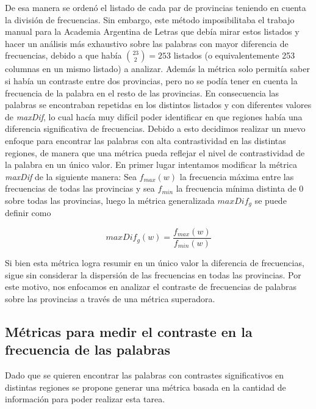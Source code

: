 De esa manera se ordenó el listado de cada par de provincias teniendo en cuenta la división de frecuencias. 
Sin embargo, este método imposibilitaba el trabajo manual para la Academia Argentina de Letras que debía mirar estos listados y hacer un análisis más exhaustivo sobre las palabras con mayor diferencia de frecuencias, debido a que había $\binom{23}{2} = 253$
listados (o equivalentemente 253 columnas en un mismo listado) a analizar. Además la métrica solo permitía saber si había un contraste entre dos provincias, pero no se podía tener en cuenta la frecuencia de la palabra en el resto de las provincias. 
En consecuencia las palabras se encontraban repetidas en los distintos listados y con diferentes valores de \textit{maxDif}, lo cual hacía muy difícil poder identificar en que regiones había una diferencia significativa de frecuencias.
Debido a esto decidimos realizar un nuevo enfoque para encontrar las palabras con alta contrastividad en las distintas regiones, de manera que una métrica pueda reflejar el nivel de contrastividad de la palabra en un único valor. En primer lugar intentamos modificar la métrica \textit{maxDif} de la siguiente manera: 
Sea $f_{max}(w)$ la frecuencia máxima entre las frecuencias de todas las provincias y sea $f_{min}$ la frecuencia mínima distinta de $0$ sobre todas las provincias, luego la métrica generalizada \textit{$maxDif_g$} se puede definir como

\begin{equation}
 maxDif_g(w) = \frac{f_{max}(w)}{f_{min}(w)}
 \label{eq:maxDifg}  
\end{equation} 

Si bien esta métrica logra resumir en un único valor la diferencia de frecuencias, sigue sin considerar la dispersión de las frecuencias en todas las provincias.
Por este motivo, nos enfocamos en analizar el contraste de frecuencias de palabras sobre las provincias a través de una métrica superadora.

\subsection{Métricas para medir el contraste en la frecuencia de las palabras}
Dado que se quieren encontrar las palabras con contrastes significativos en distintas 
regiones se propone generar una métrica basada en la cantidad de información 
para poder realizar esta tarea.

